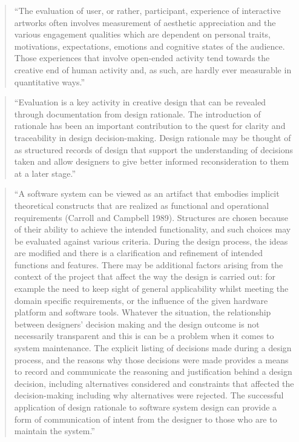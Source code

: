 \begin{quote}
  ``The evaluation of user, or rather, participant, experience of interactive artworks often involves measurement of aesthetic appreciation and the various engagement qualities which are dependent on personal traits, motivations, expectations, emotions and cognitive states of the audience. Those experiences that involve open-ended activity tend towards the creative end of human activity and, as such, are hardly ever measurable in quantitative ways.''  \parencite[p.8]{Candy2012}
\end{quote}

\begin{quote}
  ``Evaluation is a key activity in creative design that can be revealed through documentation from design rationale. The introduction of rationale has been an important contribution to the quest for clarity and traceability in design decision-making. Design rationale may be thought of as structured records of design that support the understanding of decisions taken and allow designers to give better informed reconsideration to them at a later stage.'' \parencite[p.9]{Candy2012}
\end{quote}

\begin{quote}
  ``A software system can be viewed as an artifact that embodies implicit theoretical constructs that are realized as functional and operational requirements (Carroll and Campbell 1989). Structures are chosen because of their ability to achieve the intended functionality, and such choices may be evaluated against various criteria. During the design process, the ideas are modified and there is a clarification and refinement of intended functions and features. There may be additional factors arising from the context of the project that affect the way the design is carried out: for example the need to keep sight of general applicability whilst meeting the domain specific requirements, or the influence of the given hardware platform and software tools. Whatever the situation, the relationship between designers' decision making and the design outcome is not necessarily transparent and this is can be a problem when it comes to system maintenance. The explicit listing of decisions made during a design process, and the reasons why those decisions were made provides a means to record and communicate the reasoning and justification behind a design decision, including alternatives considered and constraints that affected the decision-making including why alternatives were rejected. The successful application of design rationale to software system design can provide a form of communication of intent from the designer to those who are to maintain the system.'' \parencite[p.9]{Candy2012}
\end{quote}

